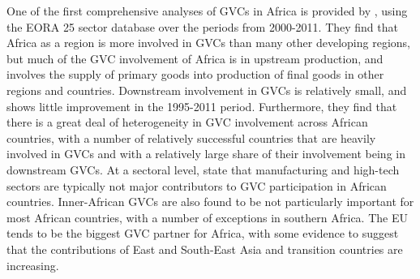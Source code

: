 \documentclass[a4paper]{article}
\begin{document}
One of the first comprehensive analyses of GVCs in Africa is provided by \citet{foster2015global}, using the EORA 25 sector database over the periods from 2000-2011. %
They find that Africa as a region is more involved in GVCs than many other developing regions, but much of the GVC involvement of Africa is in upstream production, and involves the supply of primary goods into production of final goods in other regions and countries. Downstream involvement in GVCs is relatively small, and shows little improvement in the 1995-2011 period. Furthermore, they find that there is a great deal of heterogeneity in GVC involvement across African countries, with a number of relatively successful countries that are heavily involved in GVCs and with a relatively large share of their involvement being in downstream GVCs. At a sectoral level, \citet{foster2015global} state that manufacturing and high-tech sectors are typically not major contributors to GVC participation in African countries. %
Inner-African GVCs are also found to be not particularly important for most African countries, with a number of exceptions in southern Africa. The EU tends to be the biggest GVC partner for Africa, with some evidence to suggest that the contributions of East and South-East Asia and transition countries are increasing. \newline


\end{document}
